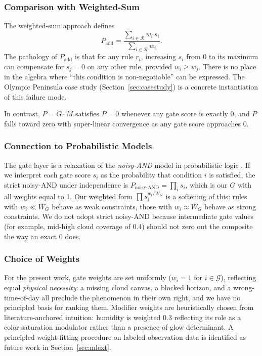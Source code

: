 \documentclass[11pt,a4paper]{article}
\begin{document}
\subsubsection{Comparison with Weighted-Sum}

The weighted-sum approach defines
\begin{equation}
P_{\text{add}} = \frac{\sum_{i \in \mathcal{R}} w_i \, s_i}{\sum_{i \in \mathcal{R}} w_i}.
\label{eq:weightedsum}
\end{equation}
The pathology of $P_{\text{add}}$ is that for any rule $r_i$, increasing $s_i$ from 0 to its maximum can compensate for $s_j = 0$ on any other rule, provided $w_i \geq w_j$. There is no place in the algebra where ``this condition is non-negotiable'' can be expressed. The Olympic Peninsula case study (Section~\ref{sec:casestudy}) is a concrete instantiation of this failure mode.

In contrast, $P = G \cdot M$ satisfies $P = 0$ whenever any gate score is exactly 0, and $P$ falls toward zero with super-linear convergence as any gate score approaches 0.

\subsubsection{Connection to Probabilistic Models}

The gate layer is a relaxation of the \emph{noisy-AND} model in probabilistic logic \citep{pearl1988probabilistic}. If we interpret each gate score $s_i$ as the probability that condition $i$ is satisfied, the strict noisy-AND under independence is $P_{\text{noisy-AND}} = \prod_i s_i$, which is our $G$ with all weights equal to 1. Our weighted form $\prod s_i^{w_i/W_G}$ is a softening of this: rules with $w_i \ll W_G$ behave as weak constraints, those with $w_i \approx W_G$ behave as strong constraints. We do not adopt strict noisy-AND because intermediate gate values (for example, mid-high cloud coverage of 0.4) should not zero out the composite the way an exact 0 does.

\subsubsection{Choice of Weights}

For the present work, gate weights are set uniformly ($w_i = 1$ for $i \in \mathcal{G}$), reflecting equal \emph{physical necessity}: a missing cloud canvas, a blocked horizon, and a wrong-time-of-day all preclude the phenomenon in their own right, and we have no principled basis for ranking them. Modifier weights are heuristically chosen from literature-anchored intuition: humidity is weighted 0.3 reflecting its role as a color-saturation modulator rather than a presence-of-glow determinant. A principled weight-fitting procedure on labeled observation data is identified as future work in Section~\ref{sec:mlext}.
\end{document}
